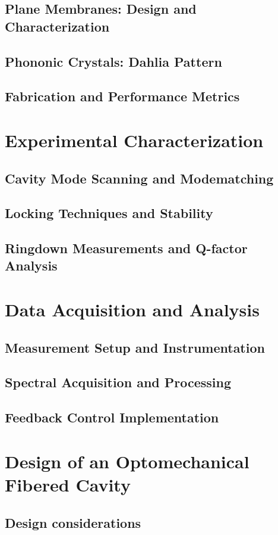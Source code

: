 \subsection{Plane Membranes: Design and Characterization}
\subsection{Phononic Crystals: Dahlia Pattern}
\subsection{Fabrication and Performance Metrics}
\section{Experimental Characterization}
\subsection{Cavity Mode Scanning and Modematching}
\subsection{Locking Techniques and Stability}
\subsection{Ringdown Measurements and Q-factor Analysis}
\section{Data Acquisition and Analysis}
\subsection{Measurement Setup and Instrumentation}
\subsection{Spectral Acquisition and Processing}
\subsection{Feedback Control Implementation}
\section{Design of an Optomechanical Fibered Cavity}
\subsection{Design considerations}


